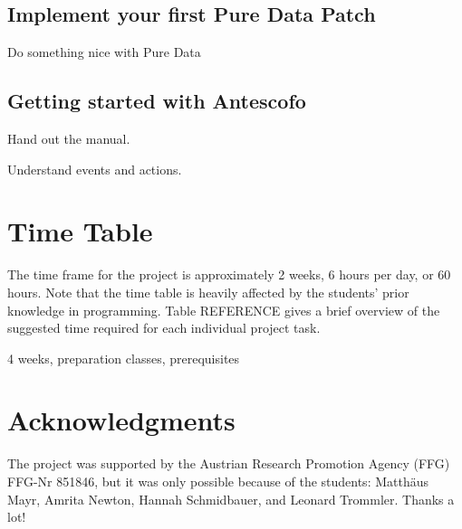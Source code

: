 \documentclass[onecolumn,nocopyrightspace,preprint]{sigplanconf}
\begin{document}
\subsection{Implement your first Pure Data Patch}

Do something nice with Pure Data


\subsection{Getting started with Antescofo}


Hand out the manual.

Understand events and actions.





\section{Time Table}

The time frame for the project is approximately 2 weeks, 6 hours per day, or
60 hours. Note that the time table is heavily affected by the students' prior
knowledge in programming. Table REFERENCE gives a brief overview of the
suggested time required for each individual project task.






4 weeks, preparation classes, prerequisites




\section{Acknowledgments}

The project was supported by the Austrian Research Promotion Agency (FFG) FFG-Nr 851846, but it
was only possible because of the students: Matthäus Mayr, Amrita Newton, Hannah Schmidbauer, and
Leonard Trommler. Thanks a lot!


 
\end{document}
